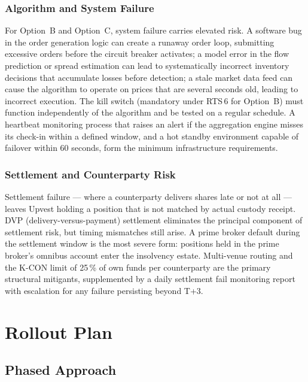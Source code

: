 \documentclass[12pt,a4paper]{report}
\begin{document}
\subsection{Algorithm and System Failure}

For Option~B and Option~C, system failure carries elevated risk. A software bug in the
order generation logic can create a runaway order loop, submitting excessive orders
before the circuit breaker activates; a model error in the flow prediction or spread
estimation can lead to systematically incorrect inventory decisions that accumulate losses
before detection; a stale market data feed can cause the algorithm to operate on prices
that are several seconds old, leading to incorrect execution. The kill switch (mandatory
under RTS\,6 for Option~B) must function independently of the algorithm and be tested
on a regular schedule. A heartbeat monitoring process that raises an alert if the
aggregation engine misses its check-in within a defined window, and a hot standby
environment capable of failover within 60 seconds, form the minimum infrastructure
requirements.

\subsection{Settlement and Counterparty Risk}

Settlement failure --- where a counterparty delivers shares late or not at all ---
leaves Upvest holding a position that is not matched by actual custody receipt. DVP
(delivery-versus-payment) settlement eliminates the principal component of settlement
risk, but timing mismatches still arise. A prime broker default during the settlement
window is the most severe form: positions held in the prime broker's omnibus account
enter the insolvency estate. Multi-venue routing and the K-CON limit of 25\,\% of own
funds per counterparty are the primary structural mitigants, supplemented by a daily
settlement fail monitoring report with escalation for any failure persisting beyond
T+3.

\chapter{Rollout Plan}

\section{Phased Approach}
\end{document}
